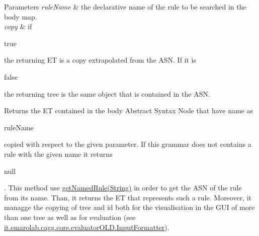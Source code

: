 \begin{DoxyParams}{Parameters}
{\em rule\-Name} & the declarative name of the rule to be searched in the body map. \\
\hline
{\em copy} & if
\begin{DoxyCode}
\textcolor{keyword}{true} 
\end{DoxyCode}
 the returning E\-T is a copy extrapolated from the A\-S\-N. If it is 
\begin{DoxyCode}
\textcolor{keyword}{false} 
\end{DoxyCode}
 the returning tree is the same object that is contained in the A\-S\-N. \\
\hline
\end{DoxyParams}
\begin{DoxyReturn}{Returns}
the E\-T contained in the body Abstract Syntax Node that have name as
\begin{DoxyCode}
ruleName 
\end{DoxyCode}
 copied with respect to the given parameter. If this grammar does not contains a rule with the given name it returns
\begin{DoxyCode}
null 
\end{DoxyCode}
 . This method use \hyperlink{classit_1_1emarolab_1_1cagg_1_1core_1_1language_1_1syntax_1_1GrammarPrimitive_ab4dc110a6bed5ad40a9c3ff396101e88}{get\-Named\-Rule(\-String)} in order to get the A\-S\-N of the rule from its name. Than, it returns the E\-T that represents such a rule. Moreover, it managge the copying of tree and id both for the visualisation in the G\-U\-I of more than one tree as well as for evaluation (see \hyperlink{}{it.\-emarolab.\-cagg.\-core.\-evaluator\-O\-L\-D.\-Input\-Formatter}). 
\end{DoxyReturn}


